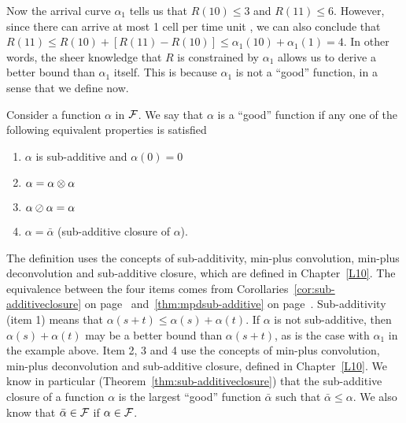 \begin{figure}[!htbp]
    \protect{}
\end{figure}
Now the arrival curve $\alpha_{1}$ tells us that $R(10)\leq 3$ and $R(11)
\leq 6$. However, since there can arrive at most 1 cell per time
unit , we can also conclude that $R(11) \leq R(10) + [R(11)-R(10)]
\leq \alpha_{1}(10) + \alpha_{1}(1) = 4$. In other words, the sheer knowledge
that $R$ is constrained by $\alpha_{1}$ allows us to derive a better
bound than $\alpha_{1}$ itself. This is because $\alpha_{1}$ is not a
``good'' function, in a sense that we define now.

\begin{definition}
    Consider a function $\alpha$ in $\mathcal F$.
    We say that $\alpha$ is a ``good'' function if any one of
    the following equivalent properties is satisfied%
%
    \begin{enumerate}
        \item  $\alpha$ is sub-additive and $\alpha(0)=0$
        \item  $\alpha= \alpha \otimes \alpha$
        \item $\alpha \oslash \alpha = \alpha$
        \item  $\alpha = \bar{\alpha}$ (sub-additive closure of $\alpha$).
    \end{enumerate}
\end{definition}

The definition uses the concepts of sub-additivity, min-plus
convolution, min-plus deconvolution and sub-additive closure,
which are defined in Chapter~\ref{L10}. The equivalence between
the four items comes from
Corollaries~\ref{cor:sub-additiveclosure} on
page~\pageref{cor:sub-additiveclosure}
and~\ref{thm:mpdsub-additive} on
page~\pageref{thm:mpdsub-additive}. Sub-additivity (item 1) means
that $\alpha(s+t) \leq \alpha(s) + \alpha(t)$.  If $\alpha$ is not
sub-additive, then $\alpha(s) + \alpha(t)$ may be a better bound
than $\alpha(s+t)$, as is the case with $\alpha_{1}$ in the
example above. Item 2, 3 and 4 use the concepts of min-plus
convolution, min-plus deconvolution and sub-additive closure,
defined in Chapter~\ref{L10}. We know in particular
(Theorem~\ref{thm:sub-additiveclosure}) that the sub-additive
closure of a function $\alpha$ is the largest ``good'' function
$\bar{\alpha}$ such that $\bar{\alpha} \leq \alpha$. We also know
that $\bar{\alpha}\in \mathcal F$ if $\alpha \in \mathcal F $.

